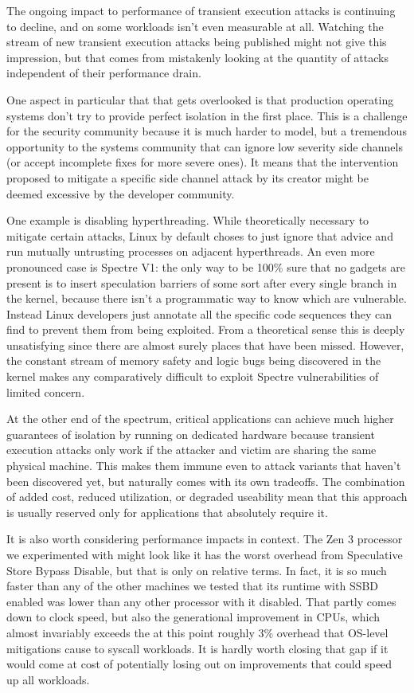 \label{s:discussion}
The ongoing impact to performance of transient execution attacks is continuing to decline, and on some workloads isn't even measurable at all.
Watching the stream of new transient execution attacks being published might not give this impression, but that comes from mistakenly looking at the quantity of attacks independent of their performance drain.

One aspect in particular that that gets overlooked is that production operating systems don't try to provide perfect isolation in the first place.
This is a challenge for the security community because it is much harder to model, but a tremendous opportunity to the systems community that can ignore low severity side channels (or accept incomplete fixes for more severe ones).
It means that the intervention proposed to mitigate a specific side channel attack by its creator might be deemed excessive by the developer community.

One example is disabling hyperthreading.
While theoretically necessary to mitigate certain attacks, Linux by default choses to just ignore that advice and run mutually untrusting processes on adjacent hyperthreads.
An even more pronounced case is Spectre V1: the only way to be 100\% sure that no gadgets are present is to insert speculation barriers of some sort after every single branch in the kernel, because there isn't a programmatic way to know which are vulnerable.
Instead Linux developers just annotate all the specific code sequences they can find to prevent them from being exploited.
From a theoretical sense this is deeply unsatisfying since there are almost surely places that have been missed.
However, the constant stream of memory safety and logic bugs being discovered in the kernel makes any comparatively difficult to exploit Spectre vulnerabilities of limited concern.

At the other end of the spectrum, critical applications can achieve much higher guarantees of isolation by running on dedicated hardware because transient execution attacks only work if the attacker and victim are sharing the same physical machine.
This makes them immune even to attack variants that haven't been discovered yet, but naturally comes with its own tradeoffs.
The combination of added cost, reduced utilization, or degraded useability mean that this approach is usually reserved only for applications that absolutely require it.

It is also worth considering performance impacts in context.
The Zen 3 processor we experimented with might look like it has the worst overhead from Speculative Store Bypass Disable, but that is only on relative terms.
In fact, it is so much faster than any of the other machines we tested that its runtime with SSBD enabled was lower than any other processor with it disabled.
That partly comes down to clock speed, but also the generational improvement in CPUs, which almost invariably exceeds the at this point roughly 3\% overhead that OS-level mitigations cause to syscall workloads.
It is hardly worth closing that gap if it would come at cost of potentially losing out on improvements that could speed up all workloads.

